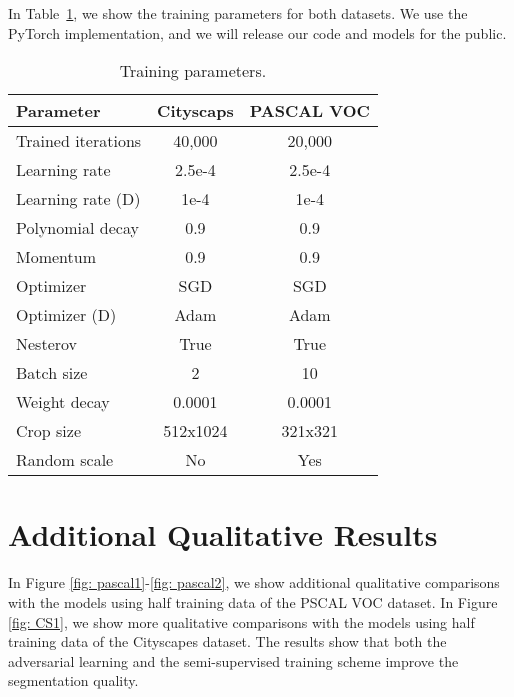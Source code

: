 \documentclass{bmvc2k}
\begin{document}
	In Table~\ref{table:train_param}, we show the training parameters for both datasets.
	We use the PyTorch implementation, and we will release our code and models for the public.
	\vspace{1cm}
	\begin{table}[h]
		\caption{Training parameters.}
		\centering
		\small
		\label{table:train_param}
		\begin{tabular}{l|c|c}
			\toprule
			Parameter & Cityscaps & PASCAL VOC \\
			\midrule
			Trained iterations & 40,000 & 20,000 \\
			Learning rate & 2.5e-4 &  2.5e-4\\
			Learning rate (D) & 1e-4 &  1e-4\\
			Polynomial decay & 0.9 & 0.9 \\
			Momentum & 0.9 & 0.9 \\
			Optimizer & SGD & SGD \\
			Optimizer (D) & Adam & Adam \\
			Nesterov & True & True \\ 
			Batch size & 2 & 10 \\
			Weight decay & 0.0001 & 0.0001 \\
			Crop size & 512x1024 & 321x321 \\
			Random scale & No & Yes \\
			
			
			\bottomrule
		\end{tabular}
	\end{table}
	
	\section{Additional Qualitative Results}
	
	In Figure \ref{fig: pascal1}-\ref{fig: pascal2}, we show additional qualitative comparisons with the models using half training data of the PSCAL VOC dataset.
	In Figure \ref{fig: CS1}, we show more qualitative comparisons with the models using half training data of the Cityscapes dataset.
	The results show that both the adversarial learning and the semi-supervised training scheme improve the segmentation quality.
	
	\newcommand{\imgrowvoc}[1]{
		\hspace{-4mm}
		\texttt{[image: imgs/voc\_results/img/\#1.jpg]}& \hspace{-4mm}
		\texttt{[image: imgs/voc\_results/voc\_gt/\#1.png]} &\hspace{-4mm}
		\texttt{[image: imgs/voc\_results/voc\_baseline/\#1.png]} &\hspace{-4mm}
		\texttt{[image: imgs/voc\_results/voc\_Ladv/\#1.png]} &\hspace{-4mm}
		\texttt{[image: imgs/voc\_results/voc\_Ladv+Lsemi/\#1.png]} \\
	}
	
\end{document}

